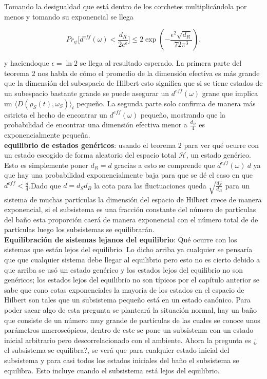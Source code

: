 
Tomando la desigualdad que está dentro de los corchetes  multiplicándola por menos y tomando su exponencial se llega

\begin{equation}
Pr_{\psi} \Big [  d^{eff}(\omega) < \frac{d_{R}}{2e^{\epsilon}} \Big ] \leq 2\exp(-\frac{\epsilon^{2}\sqrt{d_{R}}}{72\pi^{3}}).
\end{equation}

y haciendoque $\epsilon=\ln 2$ se llega al resultado esperado.
La primera parte del teorema 2 nos habla de cómo el promedio de la dimensión efectiva es más grande que la dimensión del subespacio de Hilbert esto significa que si se tiene estados de un subespacio bastante grande se puede asegurar un $d^{eff}(\omega)$ grane que implica un $\langle D(\rho_{S}(t) ,\omega_{S}) \rangle_{t}$ pequeño. La segunda parte solo confirma de manera más estricta el hecho de encontrar un $d^{eff}(\omega)$ pequeño, mostrando que la probabilidad de encontrar una dimensión efectiva menor a $\frac{d_{R}}{4}$ es exponencialmente pequeña.\\
\textbf{equilibrio de estados genéricos}:
usando el teorema 2 para ver qué ocurre con un estado escogido de forma aleatorio del espacio total $\mathcal{H}$, un estado genérico. Esto es simplemente poner $d_{R}=d$ gracias a esto se comprende que $d^{eff}(\omega)~d$ ya que  hay una probabilidad exponencialmente baja para que se dé  el caso en que $d^{eff} < \frac{d}{4}$.Dado que $d=d_{S}d_{B}$ la cota para las fluctuaciones queda $\sqrt{\frac{d_{S}}{d_{B}}}$ para un sistema de muchas partículas la dimensión del espacio de Hilbert crece de manera exponencial, si el subsistema es una fracción constante del número de partículas del baño esta proporción caerá de manera exponencial con el número total de de partículas luego los subsistemas se equilibrarán.\\
\textbf{Equilibración de sistemas lejanos del equilibrio}:
Qué ocurre con los sistemas que están lejos del equilibrio. Lo dicho arriba ya cualquier se pensaría que  que cualquier sistema debe llegar al equilibrio pero esto no es cierto debido a que arriba se usó un estado genérico y los estados lejos del equilibrio no son genéricos; los estados lejos del equilibrio no son típicos por el capítulo anterior se sabe que cono cotas exponenciales la mayoría de los estados en el espacio de Hilbert son tales que un subsistema pequeño está en un estado canónico. Para poder sacar algo de esta pregunta se planteará la situación normal, hay un baño que consiste de un número muy grande de partículas de las cuales se conoce unos parámetros macroscópicos, dentro de este se pone un subsistema con un estado inicial arbitrario pero descorrelacionado con el ambiente. Ahora la pregunta es ¿ el subsistema se equilibra?, se verá que para cualquier estado inicial del subsistema y para casi todos los estados iniciales del baño el subsistema se equilibra. Esto incluye cuando el subsistema está lejos del equilibrio.
